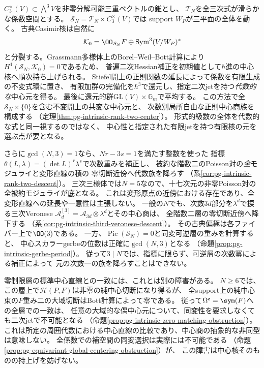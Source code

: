 $C_3^\times(V)\subset\bigwedge^3V$を非零分解可能三重ベクトルの錐とし、
$\mathcal T_N$を全三次式が滑らかな係数空間とする。
$\mathcal S_N=\mathcal T_N\times C_3^\times(V)$では
support $W_P$が三平面の全体を動く。
古典Casimir核は自然に
\begin{equation}\label{eq:intro-intrinsic-classical-kernel}
 \mathcal K_0=\OO_{\mathcal S_N}F\oplus
 \operatorname{Sym}^3(V/W_P)^*
\end{equation}
と分裂する。Grassmann多様体上のBorel--Weil--Bott計算により
$H^1(\mathcal S_N,\mathcal K_0)=0$であるため、
普遍二次Hessian補正を初期値として$\hbar$進の中心核へ順次持ち上げられる。
Stiefel開上の正則関数の延長によって係数を有限生成の不変式環に置き、
有限加群の完備化を$\hbar^3$で還元し、指定二次jetを持つ\emph{代数的な}中心元を得る。
最後に還元的群$\mathrm{GL}(V)\times\mathbb G_m$で平均する。
この方法で全$\mathcal S_N\times\{0\}$を含む不変開上の共変な中心元と、
次数別局所自由な正則中心商族を構成する
（定理\ref{thm:pg-intrinsic-rank-two-center}）。
形式的級数の全体を代数的な式と同一視するのではなく、
中心性と指定された有限jetを持つ有限核の元を選ぶ点が要となる。

さらに$\gcd(N,3)=1$なら、$Nr-3s=1$を満たす整数を使った
指標$\theta(L,\lambda)=(\det L)^r\lambda^s$で次数重みを補正し、
被約な階数二のPoisson対の\emph{全}モジュライと変形直線の積の
零切断近傍へ代数族を降ろす
（系\ref{cor:pg-intrinsic-rank-two-descent}）。
三次三様体では$N=5$なので、十七次元の非零Poisson対の全被約モジュライが底となる。
これは変形原点の近傍における存在であり、全変形直線への延長や一意性は主張しない。
一般の$N$でも、次数$3d$部分を$\lambda^d$で捩る三次Veronese
$\mathcal A^{[3]}_d=\mathcal A_{3d}\otimes\lambda^d$とその中心商は、
全階数二層の零切断近傍へ降下する
（系\ref{cor:pg-intrinsic-third-veronese-descent}）。
その古典偏極は各ファイバー上で$\OO(3)$である。
一方、$\operatorname{Pic}(\mathcal S_N)=0$と同変可逆層の重みを計算すると、
中心スカラーgerbeの位数は正確に$\gcd(N,3)$となる
（命題\ref{prop:pg-intrinsic-gerbe-period}）。
従って$3\mid N$では、指標に限らず、可逆層の次数冪による補正によって
元の次数一の族を降ろすことはできない。

零制限層の標準中心直線との一致には、これとは別の障害がある。
$N\ge6$では、この層上で$\mathscr H(P,F)$は非零の純中心切断になり得るが、
全support上の純中心束の$P$重み二の大域切断はBott計算によって零である。
従って$\Omega^{\mathrm z}=\sym(F)$への全層での一致は、
任意の大域的な偶中心元について、同変性を要求しなくても二次jetで不可能となる
（命題\ref{prop:pg-intrinsic-zero-matching-obstruction}）。
これは所定の周囲代数における中心直線の比較であり、中心商の抽象的な非同型は意味しない。
全係数での補空間の同変選択は実際には不可能である
（命題\ref{prop:pg-equivariant-global-centering-obstruction}）が、
この障害は中心核そのものの持上げを妨げない。

